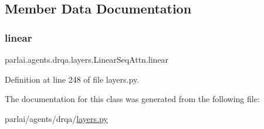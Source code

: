 \subsection{Member Data Documentation}
\mbox{\label{classparlai_1_1agents_1_1drqa_1_1layers_1_1LinearSeqAttn_a5e221c809306db7c5877e5f6f919ac7f}} 
\subsubsection{\texorpdfstring{linear}{linear}}
{\footnotesize\ttfamily parlai.\+agents.\+drqa.\+layers.\+Linear\+Seq\+Attn.\+linear}



Definition at line 248 of file layers.\+py.



The documentation for this class was generated from the following file\+:\begin{DoxyCompactItemize}
\item 
parlai/agents/drqa/\hyperlink{layers_8py}{layers.\+py}\end{DoxyCompactItemize}
